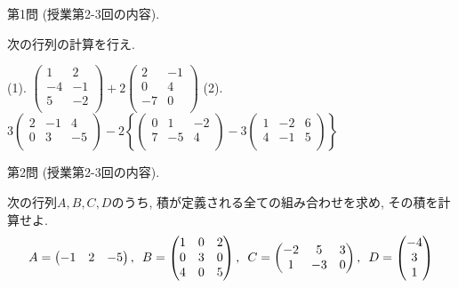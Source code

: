 \documentclass[dvipdfmx,a4paper,11pt]{article}
\theoremstyle{definition}
\begin{document}
 {\Large 第1問} (授業第2-3回の内容).
 
 \vspace{11pt}
次の行列の計算を行え.
 
  \vspace{11pt}
(1).
$
 \begin{pmatrix}
 1 &2 \\
 -4&-1\\
  5&-2\\
 \end{pmatrix}
 + 2
 \begin{pmatrix}
 2 &-1 \\
  0&4\\
  -7&0\\
 \end{pmatrix}
 $
(2).
$
3 \begin{pmatrix}
 2 &-1&4 \\
 0&3&-5\\
 \end{pmatrix}
 - 2
 \left\{
 \begin{pmatrix}
 0 &1&-2 \\
 7&-5&4\\
 \end{pmatrix}
 - 3
  \begin{pmatrix}
 1 &-2&6 \\
 4&-1&5\\
 \end{pmatrix}
\right\}
 $


   \vspace{33pt}
   
{\Large 第2問} (授業第2-3回の内容).

\vspace{11pt}
次の行列$A,B,C,D$のうち, 積が定義される全ての組み合わせを求め, その積を計算せよ.
 $$
  A=\begin{pmatrix} %
 -1 & 2 &-5  \\
 \end{pmatrix} 
 \text{, \,\,} 
B= \begin{pmatrix} %
 1& 0 & 2\\
 0 & 3 & 0\\
 4 & 0 & 5 \\
 \end{pmatrix} %
 \text{, \,\,} 
 C=
  \begin{pmatrix}
 -2 &5 & 3\\
1 &-3&0  \\
 \end{pmatrix}
 \text{, \,\,} 
 D= \begin{pmatrix} %
 -4\\
 3 \\
 1
 \end{pmatrix}
 $$
 
\end{document}
